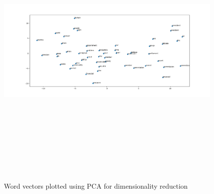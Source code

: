 \documentclass[paper=a4, fontsize=10pt, oneside]{scrartcl}
\begin{document}
\begin{figure}[b]
\hspace*{-5cm}
\centering
\includegraphics[width=22cm, height=14cm]{PCA.png}
\caption{Word vectors plotted using PCA for dimensionality reduction}
\label{PCA}
\end{figure}
\end{document}
